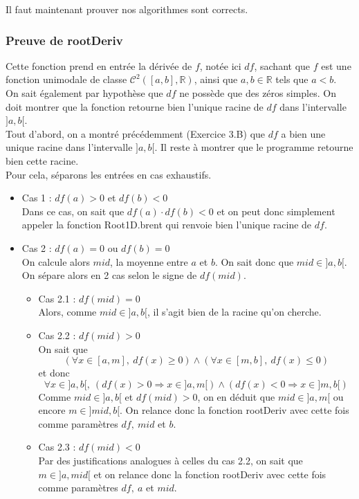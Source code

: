 \documentclass[a4paper, 12pt]{article}
\begin{document}
Il faut maintenant prouver nos algorithmes sont corrects.

\subsubsection{Preuve de rootDeriv}

Cette fonction prend en entrée la dérivée de \( f \), notée ici \( df \), sachant que \( f \) est une fonction unimodale de classe \( \mathcal{C}^2([a, b], \mathbb{R}) \), ainsi que \( a, b \in \mathbb{R} \) tels que \( a < b \). \\
On sait également par hypothèse que \( df \) ne possède que des zéros simples.
On doit montrer que la fonction retourne bien l'unique racine de \( df \) dans l'intervalle \( ]a, b[ \). \\
Tout d'abord, on a montré précédemment (Exercice 3.B) que \( df \) a bien une unique racine dans l'intervalle \( ]a, b[ \). Il reste à montrer que le programme retourne bien cette racine. \\
Pour cela, séparons les entrées en cas exhaustifs.
\begin{itemize}

    \item Cas 1 : \( df(a) > 0 \) et \( df(b) < 0 \) \\
Dans ce cas, on sait que \( df(a) \cdot df(b) < 0 \) et on peut donc simplement appeler la fonction Root1D.brent qui renvoie bien l'unique racine de \( df \).

    \item Cas 2 : \( df(a) = 0 \) ou \( df(b) = 0 \) \\
On calcule alors \( mid \), la moyenne entre \( a \) et \( b \). On sait donc que \( mid \in ]a, b[ \). On sépare alors en 2 cas selon le signe de \( df(mid) \).
    \begin{itemize}

        \item Cas 2.1 : \( df(mid) = 0 \) \\
Alors, comme \( mid \in ]a, b[ \), il s'agit bien de la racine qu'on cherche.

        \item Cas 2.2 : \( df(mid) > 0 \) \\
On sait que
$$
(\forall x \in [a, m],~ df(x) \geq 0) \land (\forall x \in [m, b],~ df(x) \leq 0)
$$
et donc
$$
\forall x \in ]a, b[,~ (df(x) > 0 \Longrightarrow x \in ]a, m[) \land (df(x) < 0 \Longrightarrow x \in ]m, b[)
$$
Comme \( mid \in ]a, b[ \) et \( df(mid) > 0 \), on en déduit que \( mid \in ]a, m[ \) ou encore \( m \in ]mid, b[ \). On relance donc la fonction rootDeriv avec cette fois comme paramètres \( df,~ mid \) et \( b \).

    \item Cas 2.3 : \( df(mid) < 0 \) \\
Par des justifications analogues à celles du cas 2.2, on sait que \( m \in ]a, mid[ \) et on relance donc la fonction rootDeriv avec cette fois comme paramètres \( df,~ a \) et \( mid \).

    \end{itemize}

\end{itemize}
\end{document}
